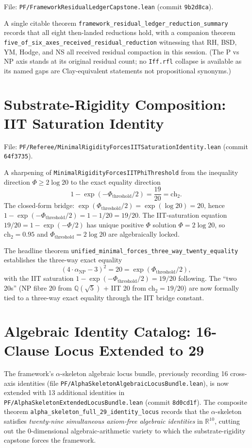 File: \texttt{PF/FrameworkResidualLedgerCapstone.lean} (commit
\texttt{9b2d8ca}).

A single citable theorem \verb|framework_residual_ledger_reduction_summary|
records that all eight then-landed reductions hold, with a companion
theorem \verb|five_of_six_axes_received_residual_reduction| witnessing
that RH, BSD, YM, Hodge, and NS all received residual compaction in
this session. (The P vs NP axis stands at its original residual count;
no \verb|Iff.rfl| collapse is available as its named gaps are
Clay-equivalent statements not propositional synonyms.)

\section{Substrate-Rigidity Composition: IIT Saturation Identity}
\label{sec:rigidity-iit-saturation}

File: \texttt{PF/Referee/MinimalRigidityForcesIITSaturationIdentity.lean}
(commit \texttt{64f3735}).

A sharpening of \texttt{MinimalRigidityForcesIITPhiThreshold} from
the inequality direction $\Phi \geq 2 \log 20$ to the exact equality
direction
\[
1 - \exp(-\Phi_{\text{threshold}}/2) = \frac{19}{20} = \mathrm{ch}_2.
\]
The closed-form bridge: $\exp(\Phi_{\text{threshold}}/2)
  = \exp(\log 20) = 20$, hence $1 - \exp(-\Phi_{\text{threshold}}/2)
  = 1 - 1/20 = 19/20$. The IIT-saturation equation
$19/20 = 1 - \exp(-\Phi/2)$ has unique positive $\Phi$ solution
$\Phi = 2 \log 20$, so $\mathrm{ch}_2 = 0.95$ and
$\Phi_{\text{threshold}} = 2 \log 20$ are algebraically locked.

The headline theorem
\verb|unified_minimal_forces_three_way_twenty_equality| establishes
the three-way exact equality
\[
(4 \cdot \alpha_{\text{NP}} - 3)^2 = 20 = \exp(\Phi_{\text{threshold}}/2),
\]
with the IIT saturation $1 - \exp(-\Phi_{\text{threshold}}/2) = 19/20$
following. The ``two 20s'' (NP fibre 20 from
$\mathbb{Q}(\sqrt{5})$ + IIT 20 from $\mathrm{ch}_2 = 19/20$) are now
formally tied to a three-way exact equality through the IIT bridge
constant.

\section{Algebraic Identity Catalog: 16-Clause Locus Extended to 29}
\label{sec:identity-catalog}

The framework's $\alpha$-skeleton algebraic locus bundle, previously
recording 16 cross-axis identities (file
\texttt{PF/AlphaSkeletonAlgebraicLocusBundle.lean}), is now extended
with 13 additional identities in
\texttt{PF/AlphaSkeletonExtendedLocusBundle.lean} (commit
\texttt{8d0cd1f}). The composite theorem
\verb|alpha_skeleton_full_29_identity_locus| records that the
$\alpha$-skeleton satisfies \emph{twenty-nine simultaneous axiom-free
algebraic identities} in $\mathbb{R}^{10}$, cutting out the 0-dimensional
algebraic-arithmetic variety to which the substrate-rigidity capstone
forces the framework.

